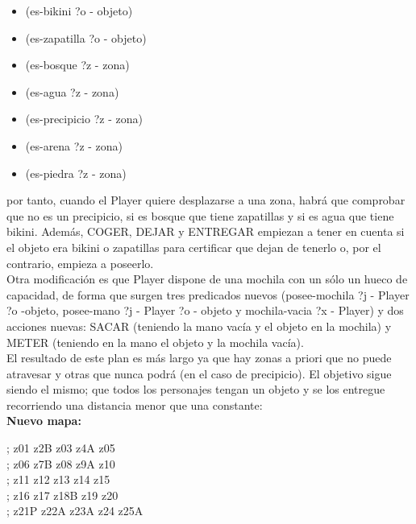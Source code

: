 \begin{itemize}
	\item (es-bikini ?o - objeto)
	\item (es-zapatilla ?o - objeto)
	\item (es-bosque ?z - zona)
	\item (es-agua ?z - zona)
	\item (es-precipicio ?z - zona)
	\item (es-arena ?z - zona)
	\item (es-piedra ?z - zona)
\end{itemize}

por tanto, cuando el Player quiere desplazarse a una zona, habrá que comprobar que no es un precipicio, si es bosque que tiene zapatillas y si es agua que tiene bikini. Además, COGER, DEJAR y ENTREGAR empiezan a tener en cuenta si el objeto era bikini o zapatillas para certificar que dejan de tenerlo o, por el contrario, empieza a poseerlo. \\

Otra modificación es que Player dispone de una mochila con un sólo un hueco de capacidad, de forma que surgen tres predicados nuevos (posee-mochila ?j - Player ?o -objeto, posee-mano ?j - Player ?o - objeto y mochila-vacia ?x - Player) y dos acciones nuevas: SACAR (teniendo la mano vacía y el objeto en la mochila) y METER (teniendo en la mano el objeto y la mochila vacía). \\ 

El resultado de este plan es más largo ya que hay zonas a priori que no puede atravesar y otras que nunca podrá (en el caso de precipicio). El objetivo sigue siendo el mismo; que todos los personajes tengan un objeto y se los entregue recorriendo una distancia menor que una constante: \\

\textbf{Nuevo mapa:}
\begin{center}
	\centering
	 ; z01  z2B  z03  z4A  z05 \\
	; z06  z7B  z08  z9A  z10 \\
	; z11 z12 z13 z14 z15 \\
	; z16 z17 z18B z19 z20 \\
	; z21P z22A z23A z24 z25A \\
\end{center}




